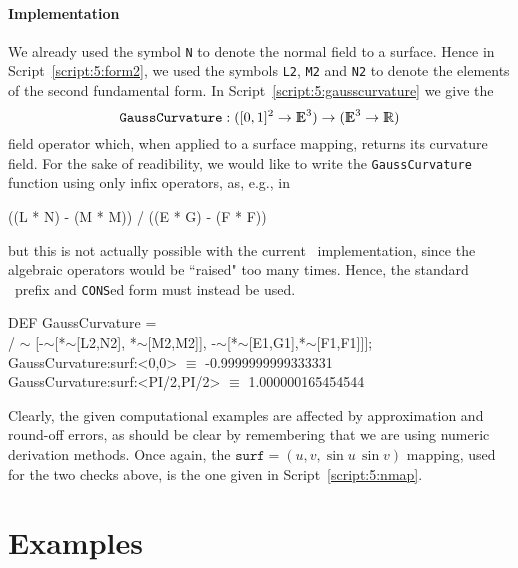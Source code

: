 \documentclass{31x47jw}
\begin{document}
\paragraph{Implementation}

We already used the symbol \texttt{N} to denote the normal field to a
surface.  Hence in Script~\ref{script:5:form2}, we used the symbols
\texttt{L2}, \texttt{M2} and \texttt{N2} to denote the elements of the
second fundamental form. In Script~\ref{script:5:gausscurvature} we 
give the 
\[
\texttt{GaussCurvature} : ([0,1]^{2}\rightarrow \mathbb{I\!\!E}^{3}) \rightarrow 
(\mathbb{I\!\!E}^{3}\rightarrow \mathbb{I\!\!R})
\]
field operator which, when applied to a surface mapping, returns its
curvature field.  For the sake of readibility, we would like to write the
\texttt{GaussCurvature} function using only infix operators, as,
e.g., in
\begin{smallplasm}
    ((L * N) - (M * M)) / ((E * G) - (F * F))
\end{smallplasm}
but this is not actually possible with the current \pl\
implementation, since the algebraic operators would be ``raised" too
many times.  Hence, the standard \fl\ prefix and \texttt{CONS}ed form
must instead be used.

\begin{script}
\begin{smallplasm}
DEF GaussCurvature  = \+\\
/ $\sim$ [-$\sim$[*$\sim$[L2,N2], 
*$\sim$[M2,M2]], -$\sim$[*$\sim$[E1,G1],*$\sim$[F1,F1]]];
\-\\[0.3cm]

GaussCurvature:surf:<0,0> $\equiv$ -0.9999999999333331\\
GaussCurvature:surf:<PI/2,PI/2> $\equiv$ 1.000000165454544
\end{smallplasm}
\label{script:5:gausscurvature}
\end{script}
Clearly, the given computational examples are affected by
approximation and round-off errors, as should be clear by remembering
that we are using numeric derivation methods.  Once again, the
$\texttt{surf} = (u, v, \sin u\,\sin v)$ mapping, used for the two
checks above, is the one given in Script~\ref{script:5:nmap}.


\section{Examples}
\end{document}
